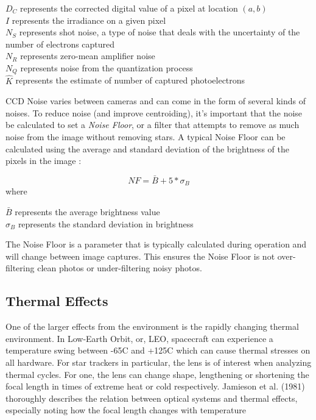 \begin{center}
    $D_C$ represents the corrected digital value of a pixel at location $(a,b)$ \\
    $I$ represents the irradiance on a given pixel \\
    $N_S$ represents shot noise, a type of noise that deals with the uncertainty of the number of electrons captured\\ 
    $N_R$ represents zero-mean amplifier noise \\
    $N_Q$ represents noise from the quantization process \\
    $\hat{K}$ represents the estimate of number of captured photoelectrons
\end{center}
 
\par \qquad CCD Noise varies between cameras and can come in the form of several kinds of noises.
To reduce noise (and improve centroiding), it's important that the noise be calculated to set a \emph{Noise Floor}, or a filter that attempts to remove as much noise from the image without removing stars.
A typical Noise Floor can be calculated using the average and standard deviation of the brightness of the pixels in the image \cite{accuracy_performance_of_star_trackers}:

\begin{equation}
    NF = \bar{B} + 5*\sigma_{B}
\end{equation}
where
\begin{center}
    $\bar{B}$ represents the average brightness value \\
    $\sigma_{B}$ represents the standard deviation in brightness
\end{center}

\par \qquad The Noise Floor is a parameter that is typically calculated during operation and will change between image captures. This ensures the Noise Floor is not over-filtering clean photos or under-filtering noisy photos.

\subsection{Thermal Effects}
\par \qquad One of the larger effects from the environment is the rapidly changing thermal environment.
In Low-Earth Orbit, or, LEO, spacecraft can experience a temperature swing between -65C and +125C\cite{NASA_LEO_Env} which can cause thermal stresses on all hardware.
For star trackers in particular, the lens is of interest when analyzing thermal cycles.
For one, the lens can change shape, lengthening or shortening the focal length in times of extreme heat or cold respectively. 
Jamieson et al. (1981) thoroughly describes the relation between optical systems and thermal effects, especially noting how the focal length changes with temperature \cite{thermal_effects_in_optical_systems}

